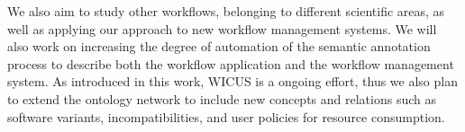 We also aim to study other workflows, belonging to different scientific areas, as well as applying our approach to new workflow management systems. We will also work on increasing  the degree of automation of the semantic annotation process to describe both the workflow application and the workflow management system. As introduced in this work, WICUS is a ongoing effort, thus we also plan to extend the ontology network to include new concepts and relations such as software variants, incompatibilities, and user policies for resource consumption.